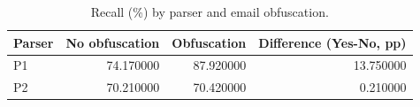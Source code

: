 \begin{table}[t]
\caption{Recall (\%) by parser and email obfuscation.}
\label{tab:parser_obfuscation}
\begin{tabular}{lrrr}
\toprule
Parser & No obfuscation & Obfuscation & Difference (Yes-No, pp) \\
\midrule
P1 & 74.170000 & 87.920000 & 13.750000 \\
P2 & 70.210000 & 70.420000 & 0.210000 \\
\bottomrule
\end{tabular}
\end{table}
